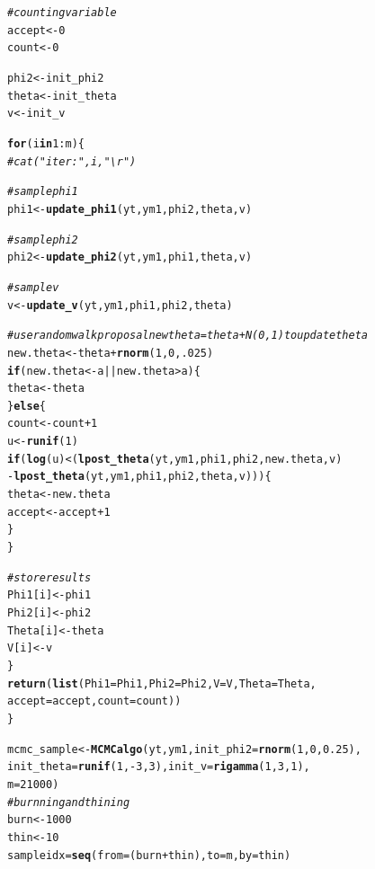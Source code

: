\documentclass[12pt]{article}\usepackage[]{graphicx}\usepackage[]{color}
\makeatletter
\newcommand{\hlnum}[1]{\textcolor[rgb]{0.686,0.059,0.569}{#1}}%
\newcommand{\hlcom}[1]{\textcolor[rgb]{0.678,0.584,0.686}{\textit{#1}}}%
\newcommand{\hlopt}[1]{\textcolor[rgb]{0,0,0}{#1}}%
\newcommand{\hlstd}[1]{\textcolor[rgb]{0.345,0.345,0.345}{#1}}%
\newcommand{\hlkwa}[1]{\textcolor[rgb]{0.161,0.373,0.58}{\textbf{#1}}}%
\newcommand{\hlkwb}[1]{\textcolor[rgb]{0.69,0.353,0.396}{#1}}%
\newcommand{\hlkwc}[1]{\textcolor[rgb]{0.333,0.667,0.333}{#1}}%
\newcommand{\hlkwd}[1]{\textcolor[rgb]{0.737,0.353,0.396}{\textbf{#1}}}%
\newenvironment{kframe}{%
 \def\at@end@of@kframe{}%
 \ifinner\ifhmode%
  \def\at@end@of@kframe{\end{minipage}}%
  \begin{minipage}{\columnwidth}%
 \fi\fi%
 \def\FrameCommand##1{\hskip\@totalleftmargin \hskip-\fboxsep
 \colorbox{shadecolor}{##1}\hskip-\fboxsep
     \hskip-\linewidth \hskip-\@totalleftmargin \hskip\columnwidth}%
 \MakeFramed {\advance\hsize-\width
   \@totalleftmargin\z@ \linewidth\hsize
   \@setminipage}}%
 {\par\unskip\endMakeFramed%
 \at@end@of@kframe}
\newenvironment{knitrout}{}{} %
\makeatother
\begin{document}
\begin{knitrout}
\begin{kframe}
\begin{alltt}
    \hlcom{# counting variable}
    \hlstd{accept} \hlkwb{<-} \hlnum{0}
    \hlstd{count} \hlkwb{<-} \hlnum{0}

    \hlstd{phi2} \hlkwb{<-} \hlstd{init_phi2}
    \hlstd{theta} \hlkwb{<-} \hlstd{init_theta}
    \hlstd{v} \hlkwb{<-} \hlstd{init_v}

    \hlkwa{for} \hlstd{(i} \hlkwa{in} \hlnum{1}\hlopt{:}\hlstd{m) \{}
        \hlcom{# cat("iter:", i, "\textbackslash{}r")}

        \hlcom{# sample phi1 }
        \hlstd{phi1} \hlkwb{<-} \hlkwd{update_phi1}\hlstd{(yt, ym1, phi2, theta, v)}

        \hlcom{# sample phi2}
        \hlstd{phi2} \hlkwb{<-} \hlkwd{update_phi2}\hlstd{(yt, ym1, phi1, theta, v)}

        \hlcom{# sample v}
        \hlstd{v} \hlkwb{<-} \hlkwd{update_v}\hlstd{(yt, ym1, phi1, phi2, theta)}

        \hlcom{# use random walk proposal newtheta = theta + N(0, 1) to update theta}
        \hlstd{new.theta} \hlkwb{<-} \hlstd{theta} \hlopt{+} \hlkwd{rnorm}\hlstd{(}\hlnum{1}\hlstd{,} \hlnum{0}\hlstd{,} \hlnum{.025}\hlstd{)}
        \hlkwa{if} \hlstd{(new.theta} \hlopt{< -}\hlstd{a} \hlopt{||} \hlstd{new.theta} \hlopt{>} \hlstd{a) \{}
            \hlstd{theta} \hlkwb{<-} \hlstd{theta}
        \hlstd{\}} \hlkwa{else} \hlstd{\{}
            \hlstd{count} \hlkwb{<-} \hlstd{count} \hlopt{+} \hlnum{1}
            \hlstd{u} \hlkwb{<-} \hlkwd{runif}\hlstd{(}\hlnum{1}\hlstd{)}
            \hlkwa{if} \hlstd{(}\hlkwd{log}\hlstd{(u)} \hlopt{<} \hlstd{(}\hlkwd{lpost_theta}\hlstd{(yt, ym1, phi1, phi2, new.theta, v)}
                          \hlopt{-} \hlkwd{lpost_theta}\hlstd{(yt, ym1, phi1, phi2, theta, v))) \{}
                \hlstd{theta} \hlkwb{<-} \hlstd{new.theta}
                \hlstd{accept} \hlkwb{<-} \hlstd{accept} \hlopt{+} \hlnum{1}
            \hlstd{\}}
        \hlstd{\}}

        \hlcom{# store results}
        \hlstd{Phi1[i]} \hlkwb{<-} \hlstd{phi1}
        \hlstd{Phi2[i]} \hlkwb{<-} \hlstd{phi2}
        \hlstd{Theta[i]} \hlkwb{<-} \hlstd{theta}
        \hlstd{V[i]} \hlkwb{<-} \hlstd{v}
    \hlstd{\}}
    \hlkwd{return}\hlstd{(}\hlkwd{list}\hlstd{(}\hlkwc{Phi1} \hlstd{= Phi1,} \hlkwc{Phi2} \hlstd{= Phi2,} \hlkwc{V} \hlstd{= V,} \hlkwc{Theta} \hlstd{= Theta,}
                \hlkwc{accept} \hlstd{= accept,} \hlkwc{count} \hlstd{= count))}
\hlstd{\}}

\hlstd{mcmc_sample} \hlkwb{<-} \hlkwd{MCMCalgo}\hlstd{(yt, ym1,} \hlkwc{init_phi2} \hlstd{=} \hlkwd{rnorm}\hlstd{(}\hlnum{1}\hlstd{,} \hlnum{0}\hlstd{,} \hlnum{0.25}\hlstd{),}
                  \hlkwc{init_theta} \hlstd{=} \hlkwd{runif}\hlstd{(}\hlnum{1}\hlstd{,} \hlopt{-}\hlnum{3}\hlstd{,} \hlnum{3}\hlstd{),} \hlkwc{init_v} \hlstd{=} \hlkwd{rigamma}\hlstd{(}\hlnum{1}\hlstd{,} \hlnum{3}\hlstd{,} \hlnum{1}\hlstd{),}
                  \hlkwc{m} \hlstd{=} \hlnum{21000}\hlstd{)}
\hlcom{# burnning and thining}
\hlstd{burn} \hlkwb{<-} \hlnum{1000}
\hlstd{thin} \hlkwb{<-} \hlnum{10}
\hlstd{sampleidx} \hlkwb{=} \hlkwd{seq}\hlstd{(}\hlkwc{from} \hlstd{= (burn} \hlopt{+} \hlstd{thin),} \hlkwc{to} \hlstd{= m,} \hlkwc{by} \hlstd{= thin)}


\end{alltt}
\end{kframe}
\end{knitrout}
\end{document}
